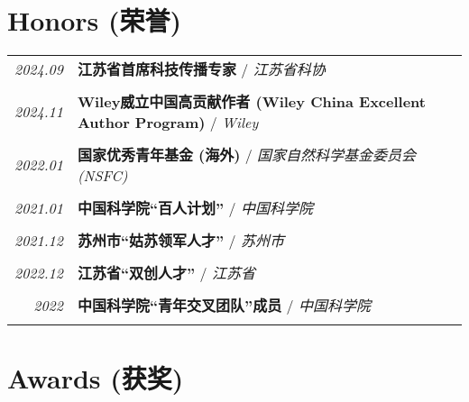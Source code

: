 \documentclass[paper=a4,fontsize=11pt]{scrartcl}
\begin{document}
\section*{Honors (荣誉)}

\begin{longtable}{r|p{11cm}}
	
	\emph{2024.09} & \textbf{江苏省首席科技传播专家} / \emph{江苏省科协}\\
	\multicolumn{2}{c}{} \\
	
	\emph{2024.11} & \textbf{Wiley威立中国高贡献作者 (Wiley China Excellent Author Program)} / \emph{Wiley}\\
	\multicolumn{2}{c}{} \\
	
	\emph{2022.01} & \textbf{国家优秀青年基金 (海外)} / \emph{国家自然科学基金委员会 (NSFC)}\\
	\multicolumn{2}{c}{} \\
	
	\emph{2021.01} & \textbf{中国科学院``百人计划''} / \emph{中国科学院}\\
	\multicolumn{2}{c}{} \\
	
	
	\emph{2021.12} & \textbf{苏州市``姑苏领军人才''} / \emph{苏州市}\\
	\multicolumn{2}{c}{} \\

	\emph{2022.12} & \textbf{江苏省``双创人才''} / \emph{江苏省}\\
	\multicolumn{2}{c}{} \\
	
	\emph{2022} & \textbf{中国科学院``青年交叉团队''成员} / \emph{中国科学院}\\
	\multicolumn{2}{c}{} 
	
\end{longtable}


\section*{Awards (获奖)}
\end{document}
